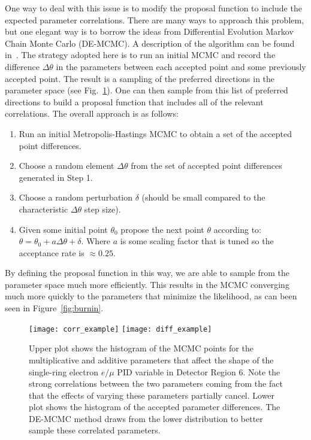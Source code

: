 One way to deal with this issue is to modify the proposal function to include
the expected parameter correlations.  There are many ways to approach this
problem, but one elegant way is to borrow the ideas from Differential Evolution
Markov Chain Monte Carlo (DE-MCMC).  A description of the algorithm can be
found in~\cite{Braak2006}. The strategy adopted here is to run an initial MCMC
and record the difference $\Delta \theta$ in the parameters between each
accepted point and some previously accepted point. The result is a sampling of
the preferred directions in the parameter space (see Fig.~\ref{fig:parcor}).
One can then sample from this list of preferred directions to build a proposal
function that includes all of the relevant correlations.  The overall approach
is as follows:
%
\begin{enumerate}
  \item Run an initial Metropolis-Hastings MCMC to obtain a set of the
    accepted point differences.  
  \item Choose a random element $\Delta \theta$ from the set of accepted point
    differences generated in Step 1.
  \item Choose a random perturbation $\delta$ (should be small compared to the characteristic
    $\Delta \theta$ step size).
  \item Given some initial point $\theta_{0}$ propose the next point $\theta$
    according to: $\theta = \theta_{0} + a \Delta \theta + \delta$. Where $a$ is some scaling factor that is
    tuned so the acceptance rate is $\approx 0.25$.
\end{enumerate}
%
By defining the proposal function in this way, we are able to sample from the
parameter space much more efficiently. This results in the MCMC converging much
more quickly to the parameters that minimize the likelihood, as can been seen in
Figure~\ref{fig:burnin}.


\begin{figure}[h]
  \begin{center}
    \texttt{[image: corr\_example]}
    \texttt{[image: diff\_example]}
  \end{center}
  \caption{Upper plot shows the histogram of the MCMC points for the
  multiplicative and additive parameters that affect the shape of the
  single-ring electron $e/\mu$ PID variable in Detector Region 6.  Note
  the strong correlations between the two parameters coming from the fact that
  the effects of varying these parameters partially cancel.  Lower plot shows
  the histogram of the accepted parameter differences.  The DE-MCMC method
  draws from the lower distribution to better sample these correlated parameters.}
  \label{fig:parcor}
\end{figure}


